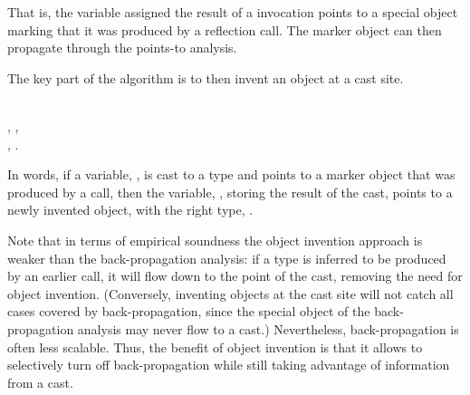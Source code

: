 \noindent That is, the variable assigned the result of a 
invocation points to a special object marking that it was produced
by a reflection call. The marker object can then propagate through
the points-to analysis.

The key part of the algorithm is to then invent an object at a cast
site.

\begin{rules}
  \\
\tab {}, ,\\
\tab {}, .
\end{rules}

\noindent In words, if a variable, , is cast to a type
 and points to a marker object that was produced by a
 call, then the variable, , storing the result
of the cast, points to a newly invented object, with the right type,
.

Note that in terms of empirical soundness the object invention
approach is weaker than the back-propagation analysis: if a type is
inferred to be produced by an earlier  call, it will flow
down to the point of the cast, removing the need for object
invention. (Conversely, inventing objects at the cast site will not
catch all cases covered by back-propagation, since the special object
of the back-propagation analysis may never flow to a cast.)
Nevertheless, back-propagation is often less scalable. Thus, the
benefit of object invention is that it allows to selectively turn off
back-propagation while still taking advantage of information from a
cast.







